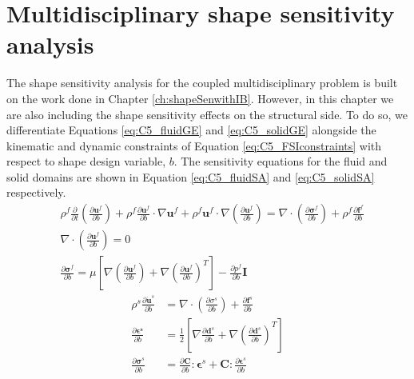 \section{Multidisciplinary shape sensitivity analysis}
The shape sensitivity analysis for the coupled multidisciplinary problem is built on the work done in Chapter \ref{ch:shapeSenwithIB}. However, in this chapter we are also including the shape sensitivity effects on the structural side. To do so, we differentiate Equations \eqref{eq:C5_fluidGE} and \eqref{eq:C5_solidGE} alongside the kinematic and dynamic constraints of Equation \eqref{eq:C5_FSIconstraints} with respect to shape design variable, $b$. The sensitivity equations for the fluid and solid domains are shown in Equation \eqref{eq:C5_fluidSA} and \eqref{eq:C5_solidSA} respectively.
%
\begin{subequations}\label{eq:C5_fluidSA}
\begin{align}
	&\rho^f \frac{\partial}{\partial t} \left( \frac{\partial \mathbf{u}^f}{\partial b} \right) + 
	\rho^f \frac{\partial \mathbf{u}^f}{\partial b} \cdot \nabla \mathbf{u}^f +
	\rho^f \mathbf{u}^f \cdot \nabla \left( \frac{\partial \mathbf{u}^f}{\partial b} \right) = 
	\nabla \cdot \left( \frac{\partial \mathbf{\sigma}^f}{\partial b} \right) +
	\rho^f \frac{\partial \mathbf{f}^f}{\partial b}
	\\
	&\nabla \cdot \left( \frac{\partial \mathbf{u}^f}{\partial b} \right) = 0
	\\
	&\frac{\partial \mathbf{\sigma}^f}{\partial b} = 
	\mu \left[ \nabla \left( \frac{\partial \mathbf{u}^f}{\partial b} \right) + 
	           \nabla \left( \frac{\partial \mathbf{u}^f}{\partial b} \right)^T \right] - 
	\frac{\partial p^f}{\partial b} \mathbf{I}
\end{align}
\end{subequations}
%
\begin{subequations}\label{eq:C5_solidSA}
\begin{align}
	\rho^s \frac{\partial \dot{\mathbf{u}}^s}{\partial b} &= 
	\nabla \cdot \left( \frac{\partial \sigma^s}{\partial b} \right) + 
	\frac{\partial \mathbf{f}^s}{\partial b}
	\\
	\frac{\partial \mathbf{\epsilon^s}}{\partial b} &=
	\frac{1}{2}
	\left[ \nabla \frac{\partial \mathbf{d}^s}{\partial b} + \nabla \left( \frac{\partial \mathbf{d}^s}{\partial b} \right)^T \right]
	\\
	\frac{\partial \mathbf{\sigma}^s}{\partial b} &= 
	\frac{\partial \mathbf{C}}{\partial b} : \mathbf{\epsilon}^s + 
	\mathbf{C} : \frac{\partial \mathbf{\epsilon}^s}{\partial b}
\end{align}
\end{subequations}
